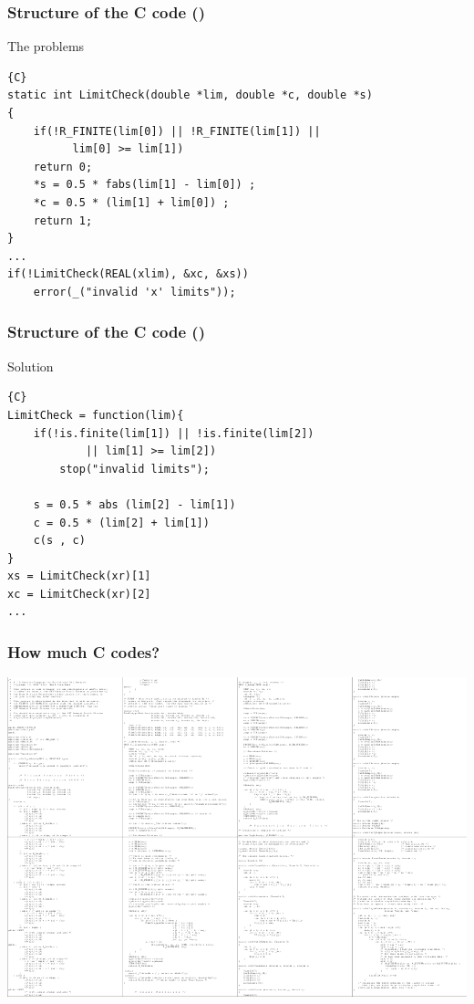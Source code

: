 \documentclass{beamer}
\begin{document}

\begin{frame}[fragile]
\frametitle{Structure of the \textbf{C} code ()}
\begin{block}{The problems}
\begin{lstlisting}{C}
static int LimitCheck(double *lim, double *c, double *s)
{
    if(!R_FINITE(lim[0]) || !R_FINITE(lim[1]) || 
          lim[0] >= lim[1])
    return 0;
    *s = 0.5 * fabs(lim[1] - lim[0]) ;
    *c = 0.5 * (lim[1] + lim[0]) ;
    return 1;
}
...
if(!LimitCheck(REAL(xlim), &xc, &xs))
	error(_("invalid 'x' limits"));
\end{lstlisting}
\end{block}

\end{frame}



\begin{frame}[fragile]
\frametitle{Structure of the \textbf{C} code ()}
\begin{block}{Solution}
\begin{lstlisting}{C}
LimitCheck = function(lim){
    if(!is.finite(lim[1]) || !is.finite(lim[2]) 
            || lim[1] >= lim[2])
        stop("invalid limits");
      
    s = 0.5 * abs (lim[2] - lim[1])
    c = 0.5 * (lim[2] + lim[1])
    c(s , c)
}
xs = LimitCheck(xr)[1]
xc = LimitCheck(xr)[2]
...
\end{lstlisting}
\end{block}

\end{frame}



\begin{frame}[fragile]
\frametitle{How much \textbf{C} codes?}
\begin{center}
\includegraphics{plot/code.png}
\end{center}
\end{frame}
\end{document}
